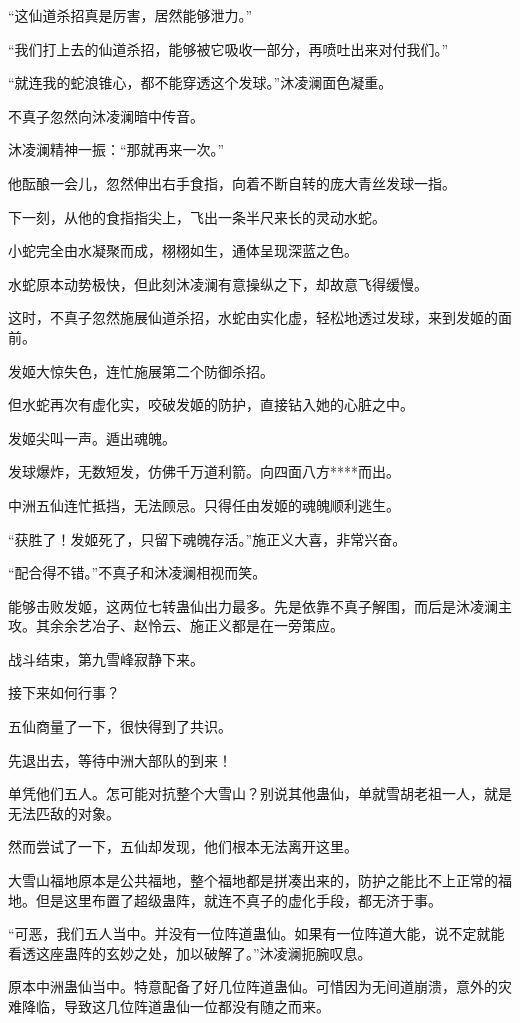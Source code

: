 \begin{this_body}
“这仙道杀招真是厉害，居然能够泄力。”

“我们打上去的仙道杀招，能够被它吸收一部分，再喷吐出来对付我们。”

“就连我的蛇浪锥心，都不能穿透这个发球。”沐凌澜面色凝重。

不真子忽然向沐凌澜暗中传音。

沐凌澜精神一振：“那就再来一次。”

他酝酿一会儿，忽然伸出右手食指，向着不断自转的庞大青丝发球一指。

下一刻，从他的食指指尖上，飞出一条半尺来长的灵动水蛇。

小蛇完全由水凝聚而成，栩栩如生，通体呈现深蓝之色。

水蛇原本动势极快，但此刻沐凌澜有意操纵之下，却故意飞得缓慢。

这时，不真子忽然施展仙道杀招，水蛇由实化虚，轻松地透过发球，来到发姬的面前。

发姬大惊失色，连忙施展第二个防御杀招。

但水蛇再次有虚化实，咬破发姬的防护，直接钻入她的心脏之中。

发姬尖叫一声。遁出魂魄。

发球爆炸，无数短发，仿佛千万道利箭。向四面八方****而出。

中洲五仙连忙抵挡，无法顾忌。只得任由发姬的魂魄顺利逃生。

“获胜了！发姬死了，只留下魂魄存活。”施正义大喜，非常兴奋。

“配合得不错。”不真子和沐凌澜相视而笑。

能够击败发姬，这两位七转蛊仙出力最多。先是依靠不真子解围，而后是沐凌澜主攻。其余余艺冶子、赵怜云、施正义都是在一旁策应。

战斗结束，第九雪峰寂静下来。

接下来如何行事？

五仙商量了一下，很快得到了共识。

先退出去，等待中洲大部队的到来！

单凭他们五人。怎可能对抗整个大雪山？别说其他蛊仙，单就雪胡老祖一人，就是无法匹敌的对象。

然而尝试了一下，五仙却发现，他们根本无法离开这里。

大雪山福地原本是公共福地，整个福地都是拼凑出来的，防护之能比不上正常的福地。但是这里布置了超级蛊阵，就连不真子的虚化手段，都无济于事。

“可恶，我们五人当中。并没有一位阵道蛊仙。如果有一位阵道大能，说不定就能看透这座蛊阵的玄妙之处，加以破解了。”沐凌澜扼腕叹息。

原本中洲蛊仙当中。特意配备了好几位阵道蛊仙。可惜因为无间道崩溃，意外的灾难降临，导致这几位阵道蛊仙一位都没有随之而来。


\end{this_body}
